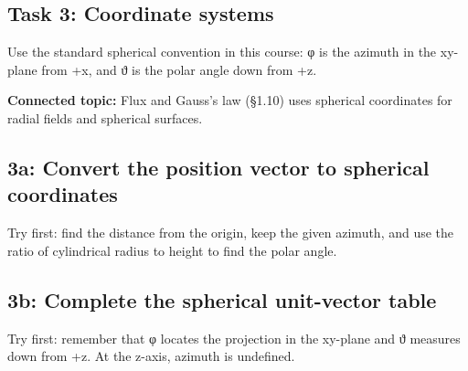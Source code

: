 \documentclass[11pt]{article}
\begin{document}
\begin{keepsection}
\section{Task 3: Coordinate systems}

Use the standard spherical convention in this course: φ is the azimuth in the xy-plane from +x, and ϑ is the polar angle down from +z.

\textbf{Connected topic:} Flux and Gauss’s law (§1.10) uses spherical coordinates for radial fields and spherical surfaces.

\begin{keepsection}
\subsection{3a: Convert the position vector to spherical coordinates}

Try first: find the distance from the origin, keep the given azimuth, and use the ratio of cylindrical radius to height to find the polar angle.

\end{keepsection}

\begin{keepsection}
\subsection{3b: Complete the spherical unit-vector table}

Try first: remember that φ locates the projection in the xy-plane and ϑ measures down from +z. At the z-axis, azimuth is undefined.

\end{keepsection}
\end{keepsection}


\clearpage
\end{document}
